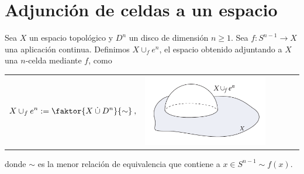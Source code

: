 \section{Adjunción de celdas a un espacio}\label{c1:unionceldas}
Sea $X$ un espacio topológico y $D^n$ un disco de dimensión $n \geq 1$. Sea $f : S^{n-1} \longrightarrow X$ una aplicación continua. Definimos $X \cup_f e^n$, el espacio obtenido adjuntando a $X$ una $n$-celda mediante $f$, como \par
\begin{tabular}{ll}
\begin{minipage}{0.5\textwidth}
\[ X \cup_f e^n := \faktor{ X \: \dot{\cup} \: D^n}{ \sim} \: , \]
\end{minipage}
&
\begin{minipage}{0.5\textwidth}
\includegraphics[width=0.8\textwidth]{images/uceldas.pdf}
\end{minipage}
\end{tabular}
donde $\sim$ es la menor relación de equivalencia que contiene a $x \in S^{n-1} \sim f(x)$.

